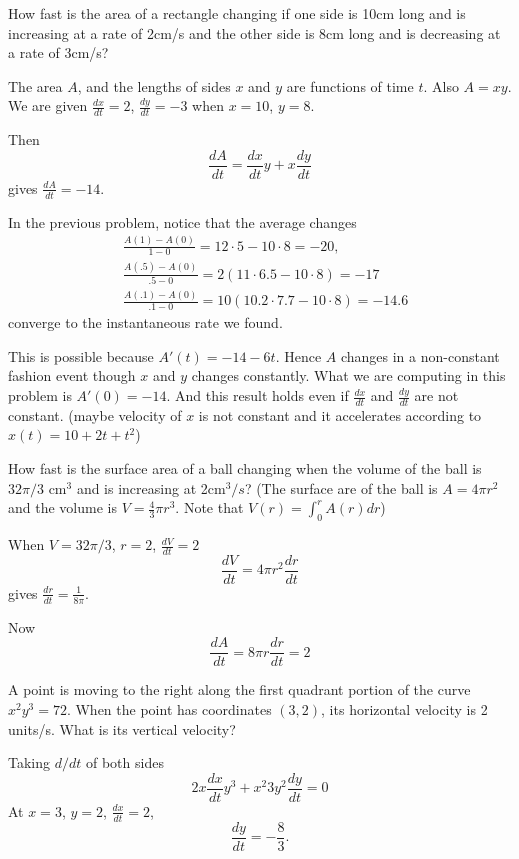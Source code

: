 \documentclass[calc1-main.tex]{subfiles}
\begin{document}
\begin{example}
  How fast is the area of a rectangle changing if one side is 10cm long and is increasing at a rate of 2cm/s and the other side is 8cm long and is decreasing at a rate of 3cm/s?
\end{example}
\begin{solution}
  The area $A$, and the lengths of sides $x$ and $y$ are functions of time $t$. Also $A = x y$. We are given $\frac{dx}{dt} = 2$, $\frac{dy}{dt} = -3$ when $x=10$, $y=8$.

  Then
  \[
    \frac{dA}{dt} = \frac{dx}{dt} y + x \frac{dy}{dt}
  \]
  gives $\frac{dA}{dt} = -14$.
\end{solution}
In the previous problem, notice that the average changes
\[
  \begin{aligned}
    & \frac{A(1)-A(0)}{1-0} = 12\cdot 5 - 10 \cdot 8 = - 20, \\
    & \frac{A(.5)-A(0)}{.5-0} = 2(11\cdot 6.5 - 10 \cdot 8) = - 17 \\
    & \frac{A(.1)-A(0)}{.1-0} = 10(10.2\cdot 7.7 - 10 \cdot 8) = - 14.6
  \end{aligned}
\]
converge to the instantaneous rate we found.



This is possible because $A'(t) = -14 - 6t$. Hence $A$ changes in a non-constant fashion event though $x$ and $y$ changes constantly. What we are computing in this problem is $A'(0) = - 14$. And this result holds even if $\frac{dx}{dt}$ and $\frac{dy}{dt}$ are not constant. (maybe velocity of $x$ is not constant and it accelerates according to $x(t) = 10 + 2t + t^2$)

\begin{example}
  How fast is the surface area of a ball changing when the volume of the ball is $32 \pi/3$ cm$^3$ and is increasing at 2cm$^3/s$? (The surface are of the ball is $A = 4\pi r^2$ and the volume is $V = \frac{4}{3} \pi r^3$. Note that $V(r) = \int_0^r A(r) dr$)
\end{example}
\begin{solution}
  When $V=32 \pi/3$, $r=2$, $\frac{dV}{dt} = 2$
  \[
    \frac{dV}{dt} = 4 \pi r^2 \frac{dr}{dt}
  \]
  gives $\frac{dr}{dt} = \frac{1}{8 \pi}$.

  Now
  \[
    \frac{dA}{dt} = 8 \pi r \frac{dr}{dt} = 2
  \]
\end{solution}

\begin{example}
  A point is moving to the right along the first quadrant portion of the curve $x^2 y^3 = 72$. When the point has coordinates $(3,2)$, its horizontal velocity is 2 units/s. What is its vertical velocity?
\end{example}
\begin{solution}
  Taking $d/dt$ of both sides
  \[
    2x \frac{dx}{dt} y^3 + x^2 3 y^2 \frac{dy}{dt} = 0
  \]
  At $x=3$, $y=2$, $\frac{dx}{dt} = 2$,
  \[
    \frac{dy}{dt} = - \frac{8}{3}.
  \]

\end{solution}
\end{document}
